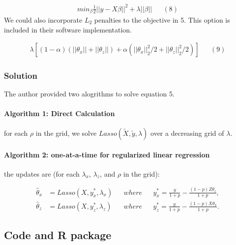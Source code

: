\documentclass[
]{article}
\begin{document}
\[
\begin{aligned}
min_\beta \frac{1}{2} || y - X\beta||^2 + \lambda || \beta|| && (8)
\end{aligned}
\] We could also incorporate \(L_2\) penalties to the objective in 5.
This option is included in their software implementation.

\[
\begin{aligned}
\lambda[ (1-\alpha)(||\theta_x||+||\theta_z||)+\alpha(||\theta_x||^2_2/2+||\theta_z||^2_2/2) ] && (9)
\end{aligned}
\]

\hypertarget{solution}{%
\subsubsection{Solution}\label{solution}}

The author provided two alogrithms to solve equation 5.

\hypertarget{algorithm-1-direct-calculation}{%
\paragraph{Algorithm 1: Direct
Calculation}\label{algorithm-1-direct-calculation}}

for each \(\rho\) in the grid, we solve
\(Lasso(\tilde X,\tilde y,\lambda)\) over a decreasing grid of
\(\lambda\).

\hypertarget{algorithm-2-one-at-a-time-for-regularized-linear-regression}{%
\paragraph{Algorithm 2: one-at-a-time for regularized linear
regression}\label{algorithm-2-one-at-a-time-for-regularized-linear-regression}}

the updates are (for each \(\lambda_x\), \(\lambda_z\), and \(\rho\) in
the grid):

\[
\begin{aligned}
\hat\theta_x &= Lasso(X,y_x^*,\lambda_x) && where && y_x^*=\frac{y}{1+p}-\frac{(1-p)Z\theta_z}{1+p},\\ 
\hat\theta_z &= Lasso(X,y_z^*,\lambda_z) && where && y_z^*=\frac{y}{1+p}-\frac{(1-p)X\theta_x}{1+p}.
\end{aligned} 
\]

\hypertarget{code-and-r-package}{%
\subsection{Code and R package}\label{code-and-r-package}}
\end{document}
